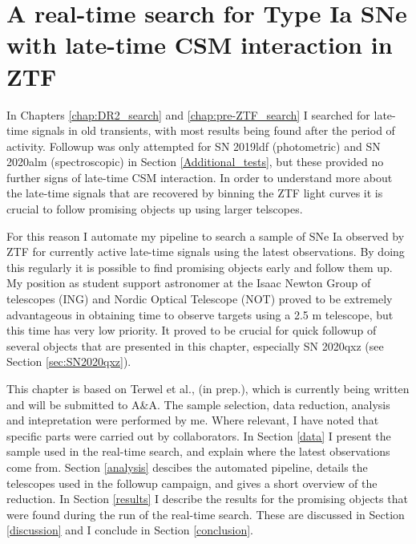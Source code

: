 \documentclass[a4paper,oneside,12pt, class=Latex/Classes/PhDthesisPSnPDF, crop=false]{standalone}
\begin{document}
\doublespacing
\chapter{A real-time search for Type Ia SNe with late-time CSM interaction in ZTF}
\label{chap:Real-time}
In Chapters \ref{chap:DR2_search} and \ref{chap:pre-ZTF_search} I searched for late-time signals in old transients, with most results being found after the period of activity. Followup was only attempted for SN 2019ldf (photometric) and SN 2020alm (spectroscopic) in Section \ref{Additional_tests}, but these provided no further signs of late-time CSM interaction. In order to understand more about the late-time signals that are recovered by binning the ZTF light curves it is crucial to follow promising objects up using larger telscopes.

For this reason I automate my pipeline to search a sample of SNe Ia observed by ZTF for currently active late-time signals using the latest observations. By doing this regularly it is possible to find promising objects early and follow them up. My position as student support astronomer at the Isaac Newton Group of telescopes (ING) and Nordic Optical Telescope (NOT) proved to be extremely advantageous in obtaining time to observe targets using a 2.5 m telescope, but this time has very low priority. It proved to be crucial for quick followup of several objects that are presented in this chapter, especially SN 2020qxz (see Section \ref{sec:SN2020qxz}).

This chapter is based on Terwel et al., (in prep.), which is currently being written and will be submitted to A\&A. The sample selection, data reduction, analysis and intepretation were performed by me. Where relevant, I have noted that specific parts were carried out by collaborators. In Section \ref{data} I present the sample used in the real-time search, and explain where the latest observations come from. Section \ref{analysis} descibes the automated pipeline, details the telescopes used in the followup campaign, and gives a short overview of the reduction. In Section \ref{results} I describe the results for the promising objects that were found during the run of the real-time search. These are discussed in Section \ref{discussion} and I conclude in Section \ref{conclusion}.

\end{document}

